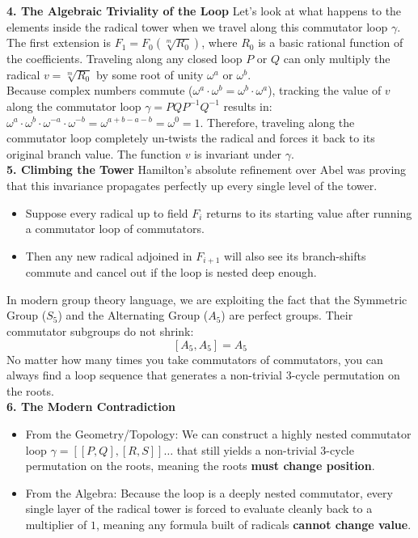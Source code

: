
{\bf 4. The Algebraic Triviality of the Loop}
Let's look at what  happens to the elements inside the radical tower when we travel along this commutator loop \(\gamma \). The first extension is \(F_1 = F_0(\sqrt[m]{R_0})\), where \(R_{0}\) is a basic rational function of the coefficients. 
Traveling along any closed loop \(P\) or \(Q\) can only multiply the radical \(v = \sqrt[m]{R_0}\) by some root of unity \(\omega ^{a}\) or \(\omega ^{b}\).\\

Because complex numbers commute (\(\omega^a \cdot \omega^b = \omega^b \cdot \omega^a\)), tracking the value of \(v\) along the commutator loop \(\gamma = P Q P^{-1} Q^{-1}\) results in:
\(\omega ^{a}\cdot \omega ^{b}\cdot \omega ^{-a}\cdot \omega ^{-b}=\omega ^{a+b-a-b}=\omega ^{0}=1\). Therefore, traveling along the commutator loop completely un-twists the radical and forces it back to its original branch value. 
The function \(v\) is invariant under \(\gamma \).\\ 

{\bf 5. Climbing the Tower}
Hamilton's absolute refinement over Abel was proving that this invariance propagates perfectly up every single level of the tower.
\begin{itemize}
\item[]Suppose every radical up to field \(F_{i}\) returns to its starting value after running a commutator loop of commutators.
\item[]Then any new radical adjoined in \(F_{i+1}\) will also see its branch-shifts commute and cancel out if the loop is nested deep enough.
\end{itemize}
In modern group theory language, we are exploiting the fact that the Symmetric Group (\(S_{5}\)) and the Alternating Group (\(A_{5}\)) are perfect groups.
Their commutator subgroups do not shrink: \[[A_{5},A_{5}]=A_{5}\]
No matter how many times you take commutators of commutators, you can always find a loop sequence that generates a non-trivial 3-cycle permutation on the roots.\\ 

{\bf 6. The Modern Contradiction}
\begin{itemize}
\item[]From the Geometry/Topology: We can construct a highly nested commutator loop \(\gamma = [[P,Q],[R,S]]\dots\) that still yields a non-trivial 3-cycle permutation on the roots, meaning the roots {\bf must change position}.
\item[]From the Algebra: Because the loop is a deeply nested commutator, every single layer of the radical tower is forced to evaluate cleanly back to a multiplier of \(1\), meaning any formula built of 
radicals {\bf cannot change value}.
\end{itemize}

